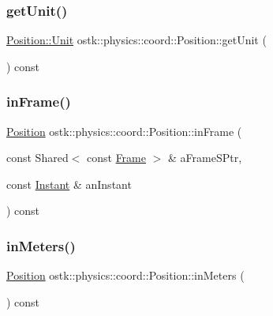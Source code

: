 \subsubsection{\texorpdfstring{get\+Unit()}{getUnit()}}
{\footnotesize\ttfamily \hyperlink{classostk_1_1physics_1_1units_1_1_length_a2664470a7eedf5d45c88861fe69badea}{Position\+::\+Unit} ostk\+::physics\+::coord\+::\+Position\+::get\+Unit (\begin{DoxyParamCaption}{ }\end{DoxyParamCaption}) const}

\mbox{\label{classostk_1_1physics_1_1coord_1_1_position_a01c22174b6c2d27ccb363f35e307c5e9}} 
\subsubsection{\texorpdfstring{in\+Frame()}{inFrame()}}
{\footnotesize\ttfamily \hyperlink{classostk_1_1physics_1_1coord_1_1_position}{Position} ostk\+::physics\+::coord\+::\+Position\+::in\+Frame (\begin{DoxyParamCaption}\item[{const Shared$<$ const \hyperlink{classostk_1_1physics_1_1coord_1_1_frame}{Frame} $>$ \&}]{a\+Frame\+S\+Ptr,  }\item[{const \hyperlink{classostk_1_1physics_1_1time_1_1_instant}{Instant} \&}]{an\+Instant }\end{DoxyParamCaption}) const}

\mbox{\label{classostk_1_1physics_1_1coord_1_1_position_a4df0c4df2717f7f6613e18a0d8e177e4}} 
\subsubsection{\texorpdfstring{in\+Meters()}{inMeters()}}
{\footnotesize\ttfamily \hyperlink{classostk_1_1physics_1_1coord_1_1_position}{Position} ostk\+::physics\+::coord\+::\+Position\+::in\+Meters (\begin{DoxyParamCaption}{ }\end{DoxyParamCaption}) const}

